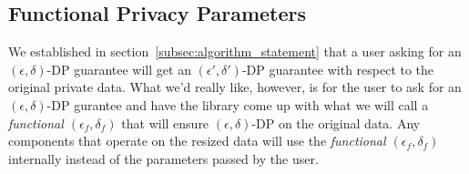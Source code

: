 \documentclass[11pt]{scrartcl} %
\begin{document}
\subsection{Functional Privacy Parameters}
We established in section~\ref{subsec:algorithm_statement} that a user asking for an $(\epsilon, \delta)$-DP guarantee will get an 
$(\epsilon', \delta')$-DP guarantee with respect to the original private data. What we'd really like, however, is for the user to ask for an $(\epsilon, \delta)$-DP 
gurantee and have the library come up with what we will call a \emph{functional $(\epsilon_f, \delta_f)$} that will ensure $(\epsilon, \delta)$-DP 
on the original data. Any components that operate on the resized data will use the \emph{functional $(\epsilon_f, \delta_f)$} internally instead of 
the parameters passed by the user.
\end{document}
